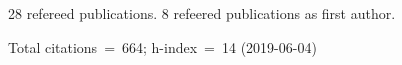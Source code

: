 28 refereed publications. 8 refeered publications as first author.

Total citations~=~664; h-index~=~14 (2019-06-04)